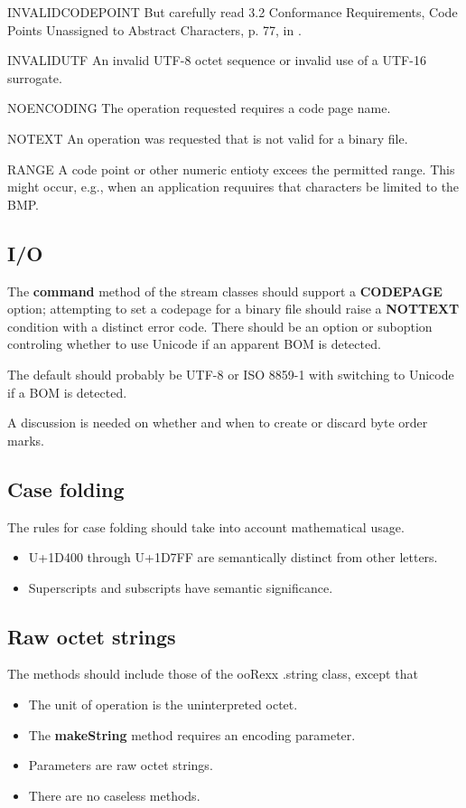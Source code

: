 \documentclass[b4paper]{article}
\begin{document}
\begin{definition}
\item [INVALIDCODEPOINT]%
But carefully read 3.2 Conformance Requirements,
Code Points Unassigned to Abstract Characters, p. 77, in \cite{Unicode}.
\item[INVALIDUTF]%
An invalid UTF-8 octet sequence or invalid use of a UTF-16 surrogate.
\item [NOENCODING]%
The operation requested requires a code page name.
\item [NOTEXT]%
An operation was requested that is not valid for a binary file.
\item [RANGE]%
A code point or other numeric entioty excees the permitted range.
This might occur, e.g., when an application requuires that characters be limited to the BMP.
\end{definition}

\subsection{I/O}

The \textbf{command} method of the stream classes should support a \textbf{CODEPAGE} option;
attempting to set a codepage for a binary file should raise a \textbf{NOTTEXT} condition with a distinct error code.
There should be an option or suboption controling whether to use Unicode if an apparent BOM is detected.

The default should probably be UTF-8 or ISO 8859-1 with switching to Unicode if a BOM is detected.

A discussion is needed on whether and when to create or discard byte order marks.

\subsection{Case folding}

The rules for case folding should take into account mathematical usage.
\begin{itemize}
\item U+1D400 through U+1D7FF are semantically distinct from other letters.
\item Superscripts and subscripts have semantic significance.
\end{itemize}

\subsection{Raw octet strings}
The methods should include those of the ooRexx .string class, except that
\begin{itemize}
\item The unit of operation is the uninterpreted octet.
\item The \textbf{makeString} method requires an encoding parameter.
\item Parameters are raw octet strings.
\item There are no caseless methods.
\end{itemize}
\end{document}
